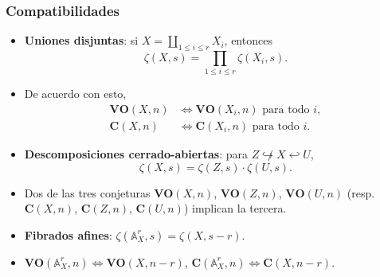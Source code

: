 \documentclass[handout]{beamer}
\renewcommand{\AA}{\mathbb{A}}
\begin{document}
\begin{frame}
  \frametitle{Compatibilidades}

  \begin{itemize}
  \item<2-> \textbf{Uniones disjuntas}: si
    $X = \coprod_{1 \le i \le r} X_i$, entonces
    \[ \zeta (X,s) = \prod_{1 \le i \le r} \zeta (X_i,s). \]

  \item<3-> De acuerdo con esto,
    \begin{align*}
      \mathbf{VO} (X,n) & \iff \mathbf{VO} (X_i,n)\text{ para todo }i, \\
      \mathbf{C} (X,n) & \iff \mathbf{C} (X_i,n)\text{ para todo }i.
    \end{align*}

  \item<4-> \textbf{Descomposiciones cerrado-abiertas}:
    para $Z \not\hookrightarrow X \hookleftarrow U$,
    \[ \zeta (X,s) = \zeta (Z,s) \cdot \zeta (U,s). \]

  \item<5-> Dos de las tres conjeturas
    $\mathbf{VO} (X,n)$, $\mathbf{VO} (Z,n)$, $\mathbf{VO} (U,n)$
    (resp. $\mathbf{C} (X,n)$, $\mathbf{C} (Z,n)$, $\mathbf{C} (U,n)$)
    implican la tercera.

  \item<6-> \textbf{Fibrados afines}:
    $\zeta (\AA^r_X, s) = \zeta (X, s-r)$.

  \item<7-> $\mathbf{VO} (\AA^r_X, n) \iff \mathbf{VO} (X, n-r)$,
    $\mathbf{C} (\AA^r_X, n) \iff \mathbf{C} (X, n-r)$.
  \end{itemize}
\end{frame}

\end{document}
